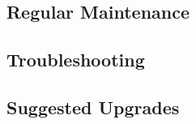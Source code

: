 \documentclass[10pt,letterpaper]{article}
\begin{document}
\subsection{Regular Maintenance}
\subsection{Troubleshooting}
\subsection{Suggested Upgrades}
\clearpage
{}



\end{document}

